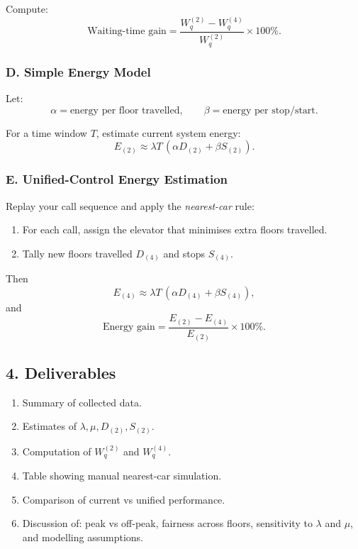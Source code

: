 \documentclass[11pt]{article}
\begin{document}
Compute:
\[
    \text{Waiting-time gain} =
    \frac{W_q^{(2)} - W_q^{(4)}}{W_q^{(2)}}\times 100\%.
\]

\subsubsection*{D. Simple Energy Model}

Let:
\[
    \alpha = \text{energy per floor travelled},\qquad
    \beta = \text{energy per stop/start}.
\]

For a time window $T$, estimate current system energy:
\[
    E_{(2)} \approx
    \lambda T\,(\alpha D_{(2)} + \beta S_{(2)}).
\]

\subsubsection*{E. Unified-Control Energy Estimation}

Replay your call sequence and apply the \emph{nearest-car} rule:

\begin{enumerate}
    \item For each call, assign the elevator that minimises extra floors
    travelled.
    \item Tally new floors travelled $D_{(4)}$ and stops $S_{(4)}$.
\end{enumerate}

Then
\[
    E_{(4)} \approx
    \lambda T\,(\alpha D_{(4)} + \beta S_{(4)}),
\]
and
\[
    \text{Energy gain} =
    \frac{E_{(2)} - E_{(4)}}{E_{(2)}}\times 100\%.
\]

\subsection{4. Deliverables}

\begin{enumerate}
    \item Summary of collected data.
    \item Estimates of $\lambda, \mu, D_{(2)}, S_{(2)}$.
    \item Computation of $W_q^{(2)}$ and $W_q^{(4)}$.
    \item Table showing manual nearest-car simulation.
    \item Comparison of current vs unified performance.
    \item Discussion of: peak vs off-peak, fairness across floors,
    sensitivity to $\lambda$ and $\mu$, and modelling assumptions.
\end{enumerate}

%
\end{document}
